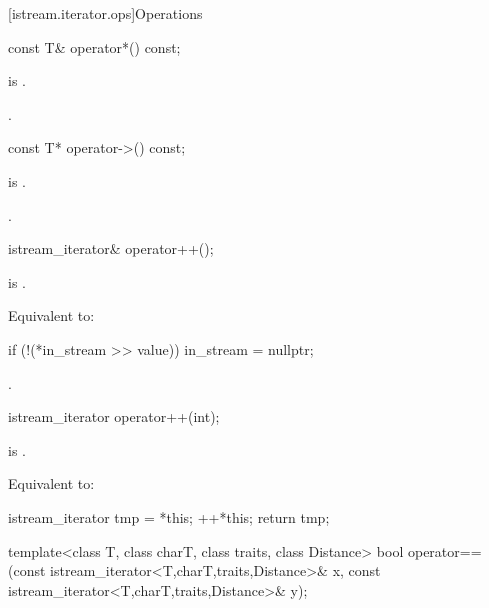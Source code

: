 [istream.iterator.ops]{Operations}

%
\begin{itemdecl}
const T& operator*() const;
\end{itemdecl}

\begin{itemdescr}
\pnum
\expects
{} is .

\pnum
\returns
{}.
\end{itemdescr}

%
\begin{itemdecl}
const T* operator->() const;
\end{itemdecl}

\begin{itemdescr}
\pnum
\expects
{} is .

\pnum
\returns
{}.
\end{itemdescr}

%
\begin{itemdecl}
istream_iterator& operator++();
\end{itemdecl}

\begin{itemdescr}
\pnum
\expects
{} is .

\pnum
\effects
Equivalent to:
\begin{codeblock}
if (!(*in_stream >> value))
  in_stream = nullptr;
\end{codeblock}

\pnum
\returns
{}.
\end{itemdescr}

%
\begin{itemdecl}
istream_iterator operator++(int);
\end{itemdecl}

\begin{itemdescr}
\pnum
\expects
{} is .

\pnum
\effects
Equivalent to:
\begin{codeblock}
istream_iterator tmp = *this;
++*this;
return tmp;
\end{codeblock}
\end{itemdescr}

%
\begin{itemdecl}
template<class T, class charT, class traits, class Distance>
  bool operator==(const istream_iterator<T,charT,traits,Distance>& x,
                  const istream_iterator<T,charT,traits,Distance>& y);
\end{itemdecl}

